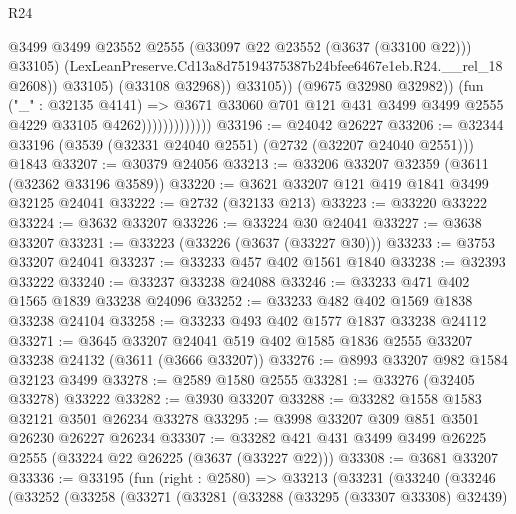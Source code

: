 \begin{lexlean}{R24}
\begin{coremodule}
                                          @3499
                                          @3499
                                          @23552
                                          @2555
                                          (@33097 @22 @23552 (@3637 (@33100 @22)))
                                          @33105)
                                        (LexLeanPreserve.Cd13a8d75194375387b24bfee6467e1eb.R24.__rel_18
                                          @2608))
                                      @33105)
                                    (@33108 @32968))
                                  @33105))
                              (@9675 @32980 @32982))
                            (fun ("_" : @32135 @4141) =>
                            @3671
                              @33060
                              @701
                              @121
                              @431
                              @3499
                              @3499
                              @2555
                              @4229
                              @33105
                              @4262)))))))))))))
@33196 := @24042 @26227
@33206 := @32344 @33196 (@3539 (@32331 @24040 @2551) (@2732 (@32207 @24040 @2551))) @1843
@33207 := @30379 @24056
@33213 := @33206 @33207 @32359 (@3611 (@32362 @33196 @3589))
@33220 := @3621 @33207 @121 @419 @1841 @3499 @32125 @24041
@33222 := @2732 (@32133 @213)
@33223 := @33220 @33222
@33224 := @3632 @33207
@33226 := @33224 @30 @24041
@33227 := @3638 @33207
@33231 := @33223 (@33226 (@3637 (@33227 @30)))
@33233 := @3753 @33207 @24041
@33237 := @33233 @457 @402 @1561 @1840
@33238 := @32393 @33222
@33240 := @33237 @33238 @24088
@33246 := @33233 @471 @402 @1565 @1839 @33238 @24096
@33252 := @33233 @482 @402 @1569 @1838 @33238 @24104
@33258 := @33233 @493 @402 @1577 @1837 @33238 @24112
@33271 := @3645
    @33207
    @24041
    @519
    @402
    @1585
    @1836
    @2555
    @33207
    @33238
    @24132
    (@3611 (@3666 @33207))
@33276 := @8993 @33207 @982 @1584 @32123 @3499
@33278 := @2589 @1580 @2555
@33281 := @33276 (@32405 @33278) @33222
@33282 := @3930 @33207
@33288 := @33282 @1558 @1583 @32121 @3501 @26234 @33278
@33295 := @3998 @33207 @309 @851 @3501 @26230 @26227 @26234
@33307 := @33282 @421 @431 @3499 @3499 @26225 @2555 (@33224 @22 @26225 (@3637 (@33227 @22)))
@33308 := @3681 @33207
@33336 := @33195
    (fun (right : @2580) =>
    @33213
      (@33231
        (@33240
          (@33246
            (@33252
              (@33258
                (@33271
                  (@33281
                    (@33288
                      (@33295 (@33307 @33308) @32439)

\end{coremodule}
\end{lexlean}
